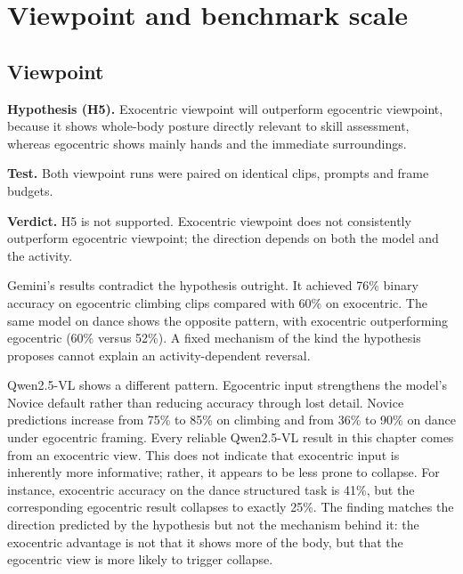 \documentclass[logo,msc]{infthesis}
\newcommand{\runin}[1]{\par\medskip\noindent\textbf{#1}}
\begin{document}
\section{Viewpoint and benchmark scale}

\subsection{Viewpoint}

\runin{Hypothesis (H5).} Exocentric viewpoint will outperform
egocentric viewpoint, because it shows whole-body posture directly relevant
to skill assessment, whereas egocentric shows mainly hands and the
immediate surroundings.

\runin{Test.} Both viewpoint runs were paired on identical clips,
prompts and frame budgets.

\runin{Verdict.} H5 is not supported. Exocentric viewpoint does not
consistently outperform egocentric viewpoint; the direction depends on both
the model and the activity.

Gemini's results contradict the hypothesis outright. It achieved 76\%
binary accuracy on egocentric climbing clips compared with 60\% on
exocentric. The same model on dance shows the opposite pattern, with
exocentric outperforming egocentric (60\% versus 52\%). A fixed mechanism
of the kind the hypothesis proposes cannot explain an activity-dependent
reversal.

Qwen2.5-VL shows a different pattern. Egocentric input strengthens the
model's Novice default rather than reducing accuracy through lost detail.
Novice predictions increase from 75\% to 85\% on climbing and from 36\% to
90\% on dance under egocentric framing. Every reliable Qwen2.5-VL result in
this chapter comes from an exocentric view. This does not indicate that
exocentric input is inherently more informative; rather, it appears to be
less prone to collapse. For instance, exocentric accuracy on the dance
structured task is 41\%, but the corresponding egocentric result collapses
to exactly 25\%. The finding matches the direction predicted by the
hypothesis but not the mechanism behind it: the exocentric advantage is not
that it shows more of the body, but that the egocentric view is more likely
to trigger collapse.
\end{document}
